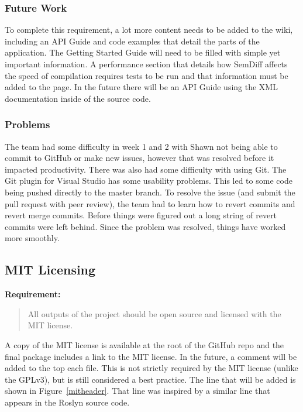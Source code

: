 \documentclass[draftclsnofoot,onecolumn]{IEEEtran}
\begin{document}
\subsubsection{Future Work}

To complete this requirement, a lot more content needs to be added to the 
wiki, including an API Guide and code examples that detail the parts of the 
application. The Getting Started Guide will need to be filled with simple 
yet important information. A performance section that details how SemDiff 
affects the speed of compilation requires tests to be run and that 
information must be added to the page. In the future there will be an API 
Guide using the XML documentation inside of the source code.

\subsubsection{Problems}

The team had some difficulty in week 1 and 2 with Shawn not being able to 
commit to GitHub or make new issues, however that was resolved before it 
impacted productivity. There was also had some difficulty with using Git. 
The Git plugin for Visual Studio has some usability problems. This led to 
some code being pushed directly to the master branch. To resolve the issue 
(and submit the pull request with peer review), the team had to learn how to 
revert commits and revert merge commits. Before things were figured out a 
long string of revert commits were left behind. Since the problem was 
resolved, things have worked more smoothly.





\subsection{MIT Licensing}

\textbf{Requirement:}

\begin{quote}

All outputs of the project should be open source and licensed with the MIT 
license.

\end{quote}

A copy of the MIT license is available at the root of the GitHub repo and 
the final package includes a link to the MIT license. In the future, a 
comment will be added to the top each file. This is not strictly required by 
the MIT license (unlike the GPLv3), but is still considered a best practice. 
The line that will be added is shown in Figure~\ref{mitheader}. That line 
was inspired by a similar line that appears in the Roslyn source code.
\end{document}
